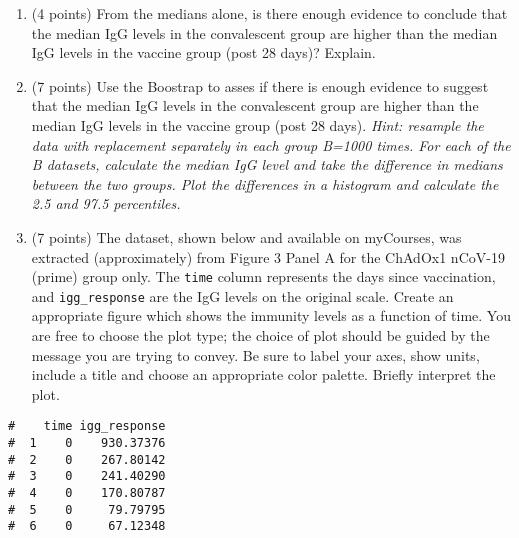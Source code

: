 \documentclass[letterpaper,12pt,twoside,]{pinp}
\providecommand{\tightlist}{%
  \setlength{\itemsep}{0pt}\setlength{\parskip}{0pt}}
\begin{document}
\begin{enumerate}
\def\labelenumi{\alph{enumi})}
\setcounter{enumi}{3}
\tightlist
\item
  (4 points) From the medians alone, is there enough evidence to
  conclude that the median IgG levels in the convalescent group are
  higher than the median IgG levels in the vaccine group (post 28 days)?
  Explain.
\item
  (7 points) Use the Boostrap to asses if there is enough evidence to
  suggest that the median IgG levels in the convalescent group are
  higher than the median IgG levels in the vaccine group (post 28 days).
  \emph{Hint: resample the data with replacement separately in each
  group B=1000 times. For each of the B datasets, calculate the median
  IgG level and take the difference in medians between the two groups.
  Plot the differences in a histogram and calculate the 2.5 and 97.5
  percentiles.}
\item
  (7 points) The dataset, shown below and available on myCourses, was
  extracted (approximately) from Figure 3 Panel A for the ChAdOx1
  nCoV-19 (prime) group only. The \texttt{time} column represents the
  days since vaccination, and \texttt{igg\_response} are the IgG levels
  on the original scale. Create an appropriate figure which shows the
  immunity levels as a function of time. You are free to choose the plot
  type; the choice of plot should be guided by the message you are
  trying to convey. Be sure to label your axes, show units, include a
  title and choose an appropriate color palette. Briefly interpret the
  plot.
\end{enumerate}

\begin{Shaded}
\begin{Highlighting}[]
\StringTok{ }\NormalTok{(}\NormalTok{)}
\end{Highlighting}
\end{Shaded}

\begin{Shaded}
\begin{Highlighting}[]
\end{Highlighting}
\end{Shaded}

\begin{ShadedResult}
\begin{verbatim}
#    time igg_response
#  1    0    930.37376
#  2    0    267.80142
#  3    0    241.40290
#  4    0    170.80787
#  5    0     79.79795
#  6    0     67.12348
\end{verbatim}
\end{ShadedResult}
\end{document}
